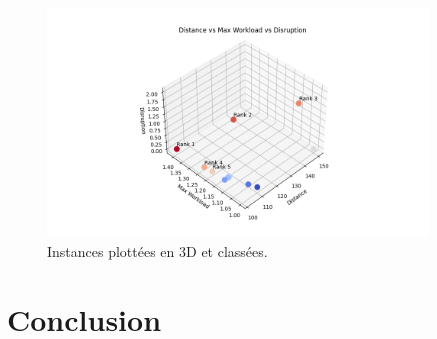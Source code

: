 \documentclass[12pt,a4paper]{article}
\begin{document}
\begin{figure}[H]
    \centering
    \includegraphics[width=0.9\textwidth]{figures/step4_uta_ranking.png}
    \caption{Instances plottées en 3D et classées.}
    \label{fig:uta_ranking}
\end{figure}


\section*{Conclusion}
\end{document}
